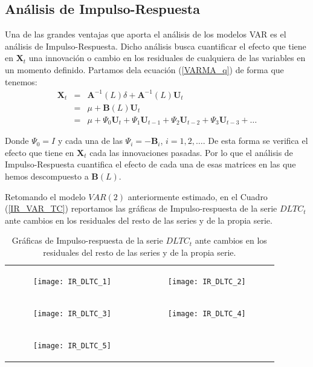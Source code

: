 \documentclass[
  a4paper,
]{article}
\begin{document}
\subsection{Análisis de
Impulso-Respuesta}\label{anuxe1lisis-de-impulso-respuesta}

Una de las grandes ventajas que aporta el análisis de los modelos VAR es
el análisis de Impulso-Respuesta. Dicho análisis busca cuantificar el
efecto que tiene en \(\mathbf{X}_t\) una innovación o cambio en los
residuales de cualquiera de las variables en un momento definido.
Partamos dela ecuación (\ref{VARMA_q}) de forma que tenemos:
\begin{eqnarray}
    \mathbf{X}_t & = & \mathbf{A}^{-1}(L) \delta + \mathbf{A}^{-1}(L) \mathbf{U}_t \nonumber \\
    & = & \mu + \mathbf{B}(L) \mathbf{U}_t \nonumber \\
    & = & \mu + \Psi_0 \mathbf{U}_t + \Psi_1 \mathbf{U}_{t-1} + \Psi_2 \mathbf{U}_{t-2} + \Psi_3 \mathbf{U}_{t-3} + \ldots
\end{eqnarray}

Donde \(\Psi_0 = I\) y cada una de las \(\Psi_i = - \mathbf{B}_i\),
\(i = 1, 2, \ldots\). De esta forma se verifica el efecto que tiene en
\(\mathbf{X}_t\) cada las innovaciones pasadas. Por lo que el análisis
de Impulso-Respuesta cuantifica el efecto de cada una de esas matrices
en las que hemos descompuesto a \(\mathbf{B}(L)\).

Retomando el modelo \(VAR(2)\) anteriormente estimado, en el Cuadro
(\ref{IR_VAR_TC}) reportamos las gráficas de Impulso-respuesta de la
serie \(DLTC_t\) ante cambios en los residuales del resto de las series
y de la propia serie.

\begin{table}
\centering
\begin{tabular}{ c c }
\begin{subfigure}\centering\texttt{[image: IR\_DLTC\_1]}\end{subfigure} & 
\begin{subfigure}\centering\texttt{[image: IR\_DLTC\_2]}\end{subfigure} \\
\newline
\begin{subfigure}\centering\texttt{[image: IR\_DLTC\_3]}\end{subfigure} & 
\begin{subfigure}\centering\texttt{[image: IR\_DLTC\_4]}\end{subfigure} \\
\newline
\begin{subfigure}\centering\texttt{[image: IR\_DLTC\_5]}\end{subfigure} & 
\end{tabular}
\caption{Gráficas de Impulso-respuesta de la serie $DLTC_t$ ante cambios en los residuales del resto de las series y de la propia serie.}

\end{table}
\end{document}
